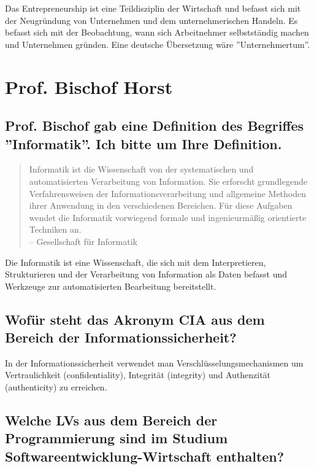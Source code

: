 Das Entrepreneurship ist eine Teildisziplin der Wirtschaft und
befasst sich mit der Neugründung von Unternehmen und dem unternehmerischen
Handeln. Es befasst sich mit der Beobachtung, wann sich Arbeitnehmer
selbstständig machen und Unternehmen gründen. Eine deutsche Übersetzung
wäre ''Unternehmertum''.

\section{Prof. Bischof Horst}

\subsection{Prof. Bischof gab eine Definition des Begriffes ''Informatik''.
    Ich bitte um Ihre Definition.}

\begin{quote}
    Informatik ist die Wissenschaft von der systematischen und
    automatisierten Verarbeitung von Information. Sie erforscht
    grundlegende Verfahrensweisen der
    Informationsverarbeitung und allgemeine Methoden ihrer
    Anwendung in den verschiedenen Bereichen. Für diese
    Aufgaben wendet die Informatik vorwiegend formale und
    ingenieurmäßig orientierte Techniken an. \\
    -- Gesellschaft für Informatik
\end{quote}

Die Informatik ist eine Wissenschaft, die sich mit dem Interpretieren,
Strukturieren und der Verarbeitung von Information als Daten befasst
und Werkzeuge zur automatisierten Bearbeitung bereitstellt.

\subsection{Wofür steht das Akronym CIA aus dem Bereich der
    Informationssicherheit?}

In der Informationssicherheit verwendet man Verschlüsselungsmechanismen
um Vertraulichkeit (confidentiality), Integrität (integrity) und 
Authenzität (authenticity) zu erreichen.

\subsection{Welche LVs aus dem Bereich der Programmierung sind im Studium
    Softwareentwicklung-Wirtschaft enthalten?}

\uncertain

